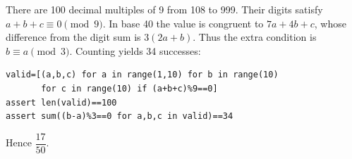 There are 100 decimal multiples of 9 from 108 to 999. Their digits satisfy $ a+b+c\equiv0\pmod9 $. In base 40 the value is congruent to $ 7a+4b+c $, whose difference from the digit sum is $ 3(2a+b)$. Thus the extra condition is $ b\equiv a\pmod3 $. Counting yields 34 successes:
\begin{verbatim}
valid=[(a,b,c) for a in range(1,10) for b in range(10)
       for c in range(10) if (a+b+c)%9==0]
assert len(valid)==100
assert sum((b-a)%3==0 for a,b,c in valid)==34
\end{verbatim}
Hence $\boxed{\dfrac{17}{50}}$.

